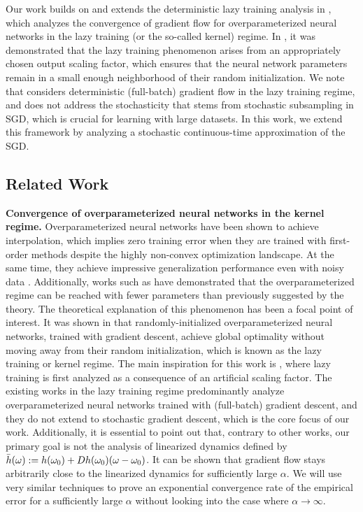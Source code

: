 \documentclass[10pt]{article} %
\begin{document}
Our work builds on and extends the deterministic lazy training analysis in \citet{ChizatBachlazyTraining}, which analyzes the convergence of gradient flow for overparameterized neural networks in the lazy training (or the so-called kernel) regime. In \cite{ChizatBachlazyTraining}, it was demonstrated that the lazy training phenomenon arises from an appropriately chosen output scaling factor, which ensures that the neural network parameters remain in a small enough neighborhood of their random initialization. We note that \citet{ChizatBachlazyTraining} considers deterministic (full-batch) gradient flow in the lazy training regime, and does not address the stochasticity that stems from stochastic subsampling in SGD, which is crucial for learning with large datasets. In this work, we extend this framework by analyzing a stochastic continuous-time approximation of the SGD.

\subsection{Related Work}
\textbf{Convergence of overparameterized neural networks in the kernel regime.} Overparameterized neural networks have been shown to achieve interpolation, which implies zero training error when they are trained with first-order methods despite the highly non-convex optimization landscape. At the same time, they achieve impressive generalization performance even with noisy data \citep{belkin2019reconciling, bartlett2020benign, zhang2021understanding}. Additionally, works such as \cite{oymak2019moderateoverparameterizationglobalconvergence} have demonstrated that the overparameterized regime can be reached with fewer parameters than previously suggested by the theory. The theoretical explanation of this phenomenon has been a focal point of interest. It was shown in \cite{jacot2020neuraltangentkernelconvergence, du2018gradient, li2018learning} that randomly-initialized overparameterized neural networks, trained with gradient descent, achieve global optimality without moving away from their random initialization, which is known as the lazy training or kernel regime. The main inspiration for this work is \citet{ChizatBachlazyTraining}, where lazy training is first analyzed as a consequence of an artificial scaling factor. The existing works in the lazy training regime predominantly analyze overparameterized neural networks trained with (full-batch) gradient descent, and they do not extend to stochastic gradient descent, which is the core focus of our work. Additionally, it is essential to point out that, contrary to other works, our primary goal is not the analysis of linearized dynamics defined by $\Bar{h}(\omega):=h(\omega_0)+Dh(\omega_0)(\omega-\omega_0)$. It can be shown that gradient flow stays arbitrarily close to the linearized dynamics for sufficiently large $\alpha$. We will use very similar techniques to prove an exponential convergence rate of the empirical error for a sufficiently large $\alpha$ without looking into the case where $\alpha\rightarrow\infty$.
\end{document}
